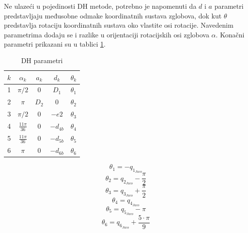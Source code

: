 \documentclass[times, utf8, diplomski, numeric]{fer}
\begin{document}

Ne ulazeći u pojedinosti DH metode, potrebno je napomenuti da $d$ i $a$ parametri predstavljaju međusobne odmake koordinatnih sustava zglobova, dok kut $\theta$ predstavlja rotaciju koordinatnih sustava oko vlastite osi rotacije. Navedenim parametrima dodaju se i razlike u orijentaciji rotacijskih osi zglobova $\alpha$. Konačni parametri prikazani su u tablici \ref{JacoDH}. 
 \begin{table}[h!]
\centering
\begin{tabular}{c c c c c}
\hline\hline
$ k $ & $ \alpha_{k} $ & $ a_{k} $ & $ d_{k} $ & $ \theta_{k} $ \\
\hline
1 & $ \pi/2 $ & $ 0 $ & $ D_{1} $ & $ \theta_{1} $\\
2 & $ \pi $ & $ D_{2} $ & 0 & $ \theta_{2} $\\
3 & $ \pi/2 $ & 0 & $ -e2 $ & $ \theta_{3} $\\
4 & $ \frac{11\pi}{36} $ & 0 & $ -d_{4b} $ & $ \theta_{4} $\\
5 & $ \frac{11\pi}{36}  $ & 0 & $ -d_{5b} $ & $ \theta_{5} $\\
6 & $ \pi $ & 0 & $ -d_{6b} $ & $ \theta_{6} $\\
\hline
\end{tabular}
\caption{DH parametri} \label{JacoDH}
\end{table}
 \begin{equation}
\theta_{1}=-q_{1_{Jaco}}
\label{q1}
\end{equation}
\begin{equation}
\theta_{2}=q_{2_{Jaco}}-\frac{\pi}{2}
\label{q2}
\end{equation}
\begin{equation}
\theta_{3}=q_{3_{Jaco}}+\frac{\pi}{2}
\label{q3}
\end{equation}
\begin{equation}
\theta_{4}=q_{4_{Jaco}}
\label{q4}
\end{equation}
\begin{equation}
\theta_{5}=q_{5_{Jaco}}-\pi
\label{q5}
\end{equation}
\begin{equation}
\theta_{6}=q_{6_{Jaco}}+\dfrac{5\cdot \pi}{9}
\label{q6}
\end{equation}
\end{document}
